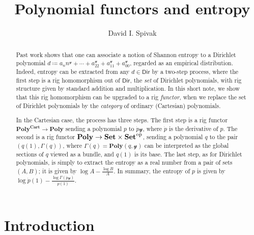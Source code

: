 \documentclass[11pt, one side, article]{memoir}
\theoremstyle{definition}
\theoremstyle{plain}
\newcommand{\Set}[1]{\mathsf{#1}}%
\newcommand{\Cat}[1]{\mathbf{#1}}%
\newcommand{\op}{^\tn{op}}
\newcommand{\tn}[1]{\textnormal{#1}}
\newcommand{\smset}{\Cat{Set}}
\newcommand{\yon}{\mathcal{y}}
\newcommand{\poly}{\Cat{Poly}}
\newcommand{\dir}{\Set{Dir}}
\newcommand{\polycart}{\poly^{\Cat{Cart}}}
\newcommand{\0}{\textsf{0}}
\newcommand{\1}{\tn{\textsf{1}}}
\begin{document}
\title{Polynomial functors and entropy}

\author{David I. Spivak}

\date{\vspace{-.2in}}

\maketitle

\begin{abstract}
Past work shows that one can associate a notion of Shannon entropy to a Dirichlet polynomial $d\coloneqq a_nn^\yon+\cdots+a_22^\yon+a_11^\yon+a_00^\yon$, regarded as an empirical distribution. Indeed, entropy can be extracted from any $d\in\dir$ by a two-step process, where the first step is a rig homomorphism out of $\dir$, the \emph{set} of Dirichlet polynomials, with rig structure given by standard addition and multiplication. In this short note, we show that this rig homomorphism can be upgraded to a rig \emph{functor}, when we replace the set of Dirichlet polynomials by the \emph{category} of ordinary (Cartesian) polynomials.

In the Cartesian case, the process has three steps. The first step is a rig functor $\polycart\to\poly$ sending a polynomial $p$ to $\dot{p}\yon$, where $\dot{p}$ is the derivative of $p$. The second is a rig functor $\poly\to\smset\times\smset\op$, sending a polynomial $q$ to the pair $(q(1),\Gamma(q))$, where $\Gamma(q)=\poly(q,\yon)$ can be interpreted as the global sections of $q$ viewed as a bundle, and $q(1)$ is its base. The last step, as for Dirichlet polynomials, is simply to extract the entropy as a real number from a pair of sets $(A,B)$; it is given by $\log A-\frac{\log B}{A}$. In summary, the entropy of $p$ is given by $\log \dot{p}(1)-\frac{\log\Gamma(\dot{p}\yon)}{\dot{p}(1)}$.
\end{abstract}

\chapter{Introduction}
\end{document}
